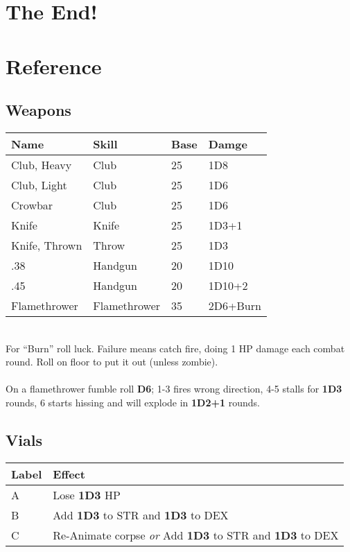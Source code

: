 \documentclass[12pt,a4paper]{article}
\begin{document}
\section*{The End!}
\newpage
\section*{Reference}
\subsection*{Weapons}
\begin{tabular}{| l | l | l | l |}
\hline
Name          & Skill        & Base & Damge\\
\hline
Club, Heavy   & Club         & 25   & 1D8\\
Club, Light   & Club         & 25   & 1D6\\
Crowbar       & Club         & 25   & 1D6\\
Knife         & Knife        & 25   & 1D3+1\\
Knife, Thrown & Throw        & 25   & 1D3\\
.38           & Handgun      & 20   & 1D10\\
.45           & Handgun      & 20   & 1D10+2\\
Flamethrower  & Flamethrower & 35   & 2D6+Burn\\ 
\hline
\end{tabular}
\vspace{0.2cm}
\\
For ``Burn'' roll luck.  Failure means catch fire, doing 1 HP damage each combat round.  Roll on floor to put it out (unless zombie).\\\\
On a flamethrower fumble roll \textbf{D6}; 1-3 fires wrong direction, 4-5 stalls for \textbf{1D3} rounds, 6 starts hissing and will explode in \textbf{1D2+1} rounds.
\subsection*{Vials}
\begin{tabular}{| l | l |}
\hline
Label & Effect\\
\hline
A     & Lose \textbf{1D3} HP\\
B     & Add \textbf{1D3} to STR and \textbf{1D3} to DEX\\
C     & Re-Animate corpse \textit{or} Add \textbf{1D3} to STR and \textbf{1D3} to DEX\\
\hline
\end{tabular}
\end{document}
